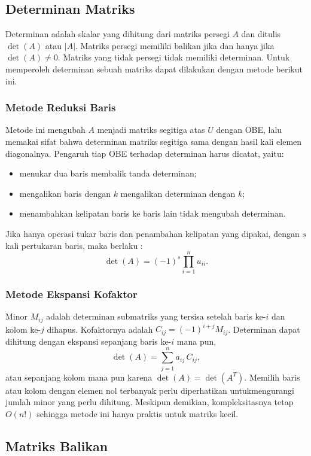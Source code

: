 \subsection{Determinan Matriks}

Determinan adalah skalar yang dihitung dari matriks persegi $A$ dan ditulis $\det(A)$ atau $|A|$. Matriks persegi memiliki balikan jika dan hanya jika $\det(A) \neq 0$. Matriks yang tidak persegi tidak memiliki determinan. Untuk memperoleh determinan sebuah matriks dapat dilakukan dengan metode berikut ini.

\subsubsection{Metode Reduksi Baris}

Metode ini mengubah $A$ menjadi matriks segitiga atas $U$ dengan OBE, lalu memakai sifat bahwa determinan matriks segitiga sama dengan hasil kali elemen diagonalnya. Pengaruh tiap OBE terhadap determinan harus dicatat, yaitu:
\begin{itemize}[nosep]
  \item menukar dua baris membalik tanda determinan;
  \item mengalikan baris dengan $k$ mengalikan determinan dengan $k$;
  \item menambahkan kelipatan baris ke baris lain tidak mengubah determinan.
\end{itemize}
Jika hanya operasi tukar baris dan penambahan kelipatan yang dipakai, dengan $s$ kali pertukaran baris, maka berlaku :
\[
\det(A) = (-1)^{s} \prod_{i=1}^{n} u_{ii} .
\]

\subsubsection{Metode Ekspansi Kofaktor}

Minor $M_{ij}$ adalah determinan submatriks yang tersisa setelah baris ke-$i$ dan kolom ke-$j$ dihapus. Kofaktornya adalah $C_{ij} = (-1)^{i+j} M_{ij}$. Determinan dapat dihitung dengan ekspansi sepanjang baris ke-$i$ mana pun,
\[
\det(A) = \sum_{j=1}^{n} a_{ij}\, C_{ij},
\]
atau sepanjang kolom mana pun karena $\det(A) = \det(A^T)$. Memilih baris atau kolom dengan elemen nol terbanyak perlu diperhatikan untukmengurangi jumlah minor yang perlu dihitung. Meskipun demikian, kompleksitasnya tetap $O(n!)$ sehingga metode ini hanya praktis untuk matriks kecil.

\subsection{Matriks Balikan}

